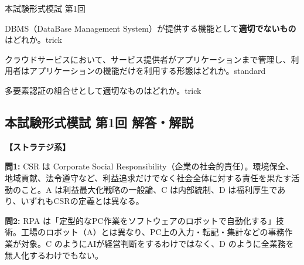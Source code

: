 \begin{honshikenmoshi}{本試験形式模試 第1回}
\begin{mondai}{DBMS（DataBase Management System）が提供する機能として\textbf{適切でないもの}はどれか。}{trick}
\end{mondai}

\begin{mondai}{クラウドサービスにおいて、サービス提供者がアプリケーションまで管理し、利用者はアプリケーションの機能だけを利用する形態はどれか。}{standard}
\end{mondai}

\begin{mondai}{多要素認証の組合せとして適切なものはどれか。}{trick}
\end{mondai}

\end{honshikenmoshi}

\kaitoupage
\subsection*{本試験形式模試 第1回 解答・解説}

\noindent\textbf{【ストラテジ系】}

\begin{kaisetsu}
\textbf{問1:} CSR は Corporate Social Responsibility（企業の社会的責任）。環境保全、地域貢献、法令遵守など、利益追求だけでなく社会全体に対する責任を果たす活動のこと。A は利益最大化戦略の一般論、C は内部統制、D は福利厚生であり、いずれもCSRの定義とは異なる。
\end{kaisetsu}

\begin{kaisetsu}
\textbf{問2:} RPA は「定型的なPC作業をソフトウェアのロボットで自動化する」技術。工場のロボット（A）とは異なり、PC上の入力・転記・集計などの事務作業が対象。C のようにAIが経営判断をするわけではなく、D のように全業務を無人化するわけでもない。
\end{kaisetsu}

